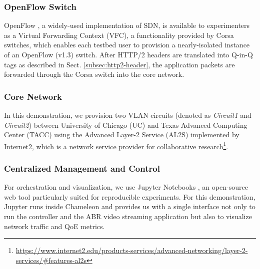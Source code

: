 \subsubsection{OpenFlow Switch}
OpenFlow \cite{McKeown:2008}, a widely-used implementation of SDN, is available to experimenters as a Virtual Forwarding Context (VFC), a functionality provided by Corsa switches, which enables each testbed user to provision a nearly-isolated instance of an OpenFlow (v1.3) switch. After HTTP/2 headers are translated into Q-in-Q tags as described in Sect. \ref{subsec:http2-header}, the application packets are forwarded through the Corsa switch into the core network.
\subsubsection{Core Network}
In this demonstration, we provision two VLAN circuits (denoted as \textit{Circuit1} and \textit{Circuit2}) between University of Chicago (UC) and Texas Advanced Computing Center (TACC) using the Advanced Layer-2 Service (AL2S) implemented by Internet2, which is a network service provider for collaborative research\footnote{\url{https://www.internet2.edu/products-services/advanced-networking/layer-2-services/#features-al2s}}.
\subsubsection{Centralized Management and Control}
For orchestration and visualization, we use Jupyter Notebooks \cite{kluyver2016jupyter}, an open-source web tool particularly suited for reproducible experiments. For this demonstration, Jupyter runs inside Chameleon and provides us with a single interface not only to run the controller and the ABR video streaming application but also to visualize network traffic and QoE metrics. 



